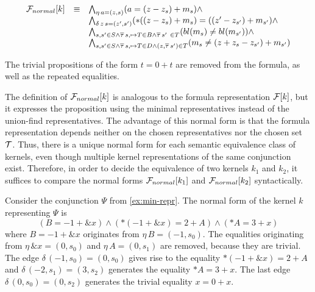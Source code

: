 \[
    \begin{array}{lll}
        \mathcal{F}_{normal}[k] & \equiv & \bigwedge_{\eta\,a=(z,s)} (a = (z - z_s) + m_s) \land                                                                     \\
                       &        & \bigwedge_{\delta\,z\,s=(z',s')} (*((z-z_s) + m_s) = ((z'-z_{s'}) + m_{s'}) \land                                         \\
                       &        & \bigwedge_{s,s' \in S \land \overline{\tau}\,s, \mapsto T \in B \land \overline{\tau}\,s'\ \in T} (bl(m_{s}) \neq bl(m_{s'})) \land           \\
                       &        & \bigwedge_{s,s' \in S \land \overline{\tau}\,s, \mapsto T \in D \land (z,\overline{\tau}\,s') \in T} (m_{s} \neq (z+ z_{s} -z_{s'}) + m_{s'})
    \end{array}
\]

The trivial propositions of the form $t = 0 + t$ are removed from the formula, as well as the repeated equalities.

The definition of $\mathcal{F}_{normal}[k]$ is analogous to the formula representation $\mathcal{F}[k]$, but it expresses the proposition using the minimal representatives instead of the union-find representatives.
The advantage of this normal form is that the formula representation depends neither on the chosen representatives nor the chosen set $\mathcal{T}$.
Thus, there is a unique normal form for each semantic equivalence class of kernels, even though multiple kernel representations of the same conjunction exist.
Therefore, in order to decide the equivalence of two kernels $k_1$ and $k_2$, it suffices to compare the normal forms $\mathcal{F}_{normal}[k_1]$ and $\mathcal{F}_{normal}[k_2]$ syntactically.

\begin{example}
    Consider the conjunction $\Psi$ from \cref{ex:min-repr}.
    The normal form of the kernel $k$ representing $\Psi$ is
    \[
        (B = -1+\&x) \land (*(-1 + \&x) = 2 + A) \land (*A = 3 + x)
    \]
    where $B = -1 + \&x$ originates from $\eta\,B = (-1,s_0)$.
    The equalities originating from $\eta\,\&x = (0,s_0)$ and $\eta\,A = (0, s_1)$ are removed, because they are trivial.
    The edge $\delta\,(-1,s_0) = (0,s_0)$ gives rise to the equality $*(-1 + \&x) = 2 + A$ and $\delta\,(-2,s_1) = (3,s_2)$ generates the equality $*A = 3 + x$.
    The last edge $\delta\,(0,s_0) = (0,s_2)$ generates the trivial equality $x = 0 + x$.
\end{example}


